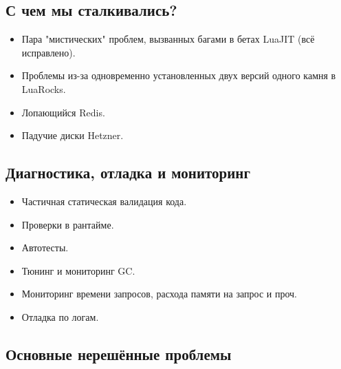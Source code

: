 \documentclass[aspectratio=169,handout,bigger]{beamer}
\begin{document}
\subsection*{С чем мы сталкивались?}

\begin{frame}
  \begin{itemize}
    \item Пара "мистических" проблем, вызванных багами в бетах LuaJIT (всё исправлено).
    \item Проблемы из-за одновременно установленных двух версий одного камня в LuaRocks.
    \item Лопающийся Redis.
    \item Падучие диски Hetzner.
  \end{itemize}
\end{frame}


\subsection*{Диагностика, отладка и мониторинг}

\begin{frame}
  \begin{itemize}
    \item Частичная статическая валидация кода.
    \item Проверки в рантайме.
    \item Автотесты.
    \item Тюнинг и мониторинг GC.
    \item Мониторинг времени запросов, расхода памяти на запрос и проч.
    \item Отладка по логам.
  \end{itemize}
\end{frame}



\subsection*{Основные нерешённые проблемы}
\end{document}
